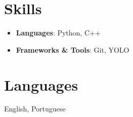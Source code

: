 \documentclass[a4paper,10pt]{article}
\begin{document}
\section*{Skills}
\begin{itemize}[leftmargin=*, noitemsep, topsep=0pt]
    \item \textbf{Languages}: Python, C++
    \item \textbf{Frameworks \& Tools}: Git, YOLO
\end{itemize}


\section*{Languages}
English, Portuguese
\end{document}
